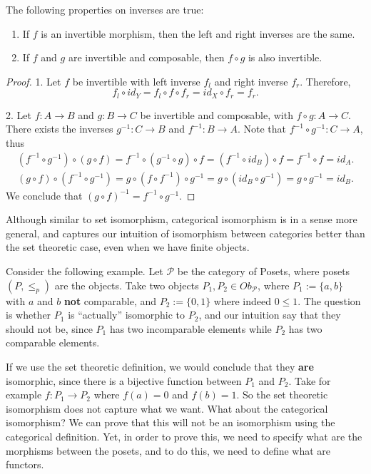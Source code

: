 \begin{proposition}
	The following properties on inverses are true:
	\begin{enumerate}[1.]
		\item If $f$ is an invertible morphism, then the left and right inverses are the same.
		\item If $f$ and $g$ are invertible and composable, then $f \circ g$ is also invertible.
	\end{enumerate}
\end{proposition}
\begin{proof}
	1. Let $f$ be invertible with left inverse $f_l$ and right inverse $f_r$. Therefore,
	\begin{displaymath}
		f_l \circ id_Y = f_l \circ f \circ f_r = id_X \circ f_r = f_r.
	\end{displaymath}

	2. Let $f:A\to B$ and $g: B \to C$ be invertible and composable, with $f\circ g: A \to C$.
	There exists the inverses $g^{-1}: C \to B$ and $f^{-1}:B \to A$. Note that
	$f^{-1}\circ g^{-1}:C \to A$, thus
	\begin{align*}
		(f^{-1} \circ g^{-1}) \circ (g \circ f) =
		f^{-1} \circ (g^{-1} \circ g) \circ f =
		(f^{-1} \circ id_B) \circ f =
		f^{-1} \circ f =
		id_A.
	\end{align*}
	\begin{align*}
		(g \circ f) \circ (f^{-1} \circ g^{-1})  =
		g \circ (f \circ f^{-1}) \circ g^{-1} =
		g \circ (id_B \circ g^{-1}) =
		g \circ g^{-1} =
		id_B.
	\end{align*}
	We conclude that $(g\circ f)^{-1} = f^{-1} \circ g^{-1}$.

\end{proof}
Although similar to set isomorphism, categorical isomorphism is in a sense more general,
and captures our intuition of isomorphism between categories better than the set theoretic case,
even when we have finite objects.

Consider the following example.
Let $\mathcal P$ be the category of Posets, where posets $(P,\leq_p)$ are the objects.
Take two objects $P_1, P_2 \in Ob_\mathcal P$,
where $P_1:=\{a,b\}$ with $a$ and $b$ \textbf{not} comparable,
and $P_2:=\{0,1\}$ where indeed $0 \leq 1$. The question is whether $P_1$ is ``actually'' isomorphic
to $P_2$, and our intuition say that they should not be, since
$P_1$ has two incomparable elements while $P_2$ has two comparable elements.

If we use the set theoretic definition, we would conclude that they \textbf{are} isomorphic,
since there is a bijective function between $P_1$ and $P_2$.
Take for example $f:P_1\to P_2$ where $f(a)=0$ and $f(b)=1$.
So the set theoretic isomorphism does not capture what we want. What about the categorical isomorphism?
We can prove that this will not be an isomorphism using the categorical definition. Yet,
in order to prove this, we need to specify what are the morphisms between the posets,
and to do this, we need to define what are functors.

